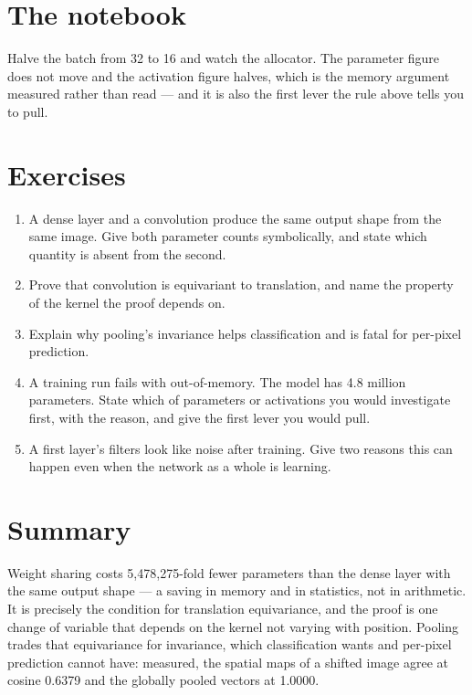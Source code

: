 \documentclass[11pt,a4paper]{article}
\begin{document}
\section{The notebook}

\begin{trybox}[title={What to change}]
Halve the batch from 32 to 16 and watch the allocator. The parameter figure
does not move and the activation figure halves, which is the memory argument
measured rather than read --- and it is also the first lever the rule above
tells you to pull.
\end{trybox}

\section{Exercises}

\begin{enumerate}[leftmargin=1.6em,itemsep=4pt]
  \item A dense layer and a convolution produce the same output shape from the
        same image. Give both parameter counts symbolically, and state which
        quantity is absent from the second. \hfill \scope{[5]}
  \item Prove that convolution is equivariant to translation, and name the
        property of the kernel the proof depends on. \hfill \scope{[4]}
  \item Explain why pooling's invariance helps classification and is fatal for
        per-pixel prediction. \hfill \scope{[4]}
  \item A training run fails with out-of-memory. The model has 4.8 million
        parameters. State which of parameters or activations you would
        investigate first, with the reason, and give the first lever you would
        pull. \hfill \scope{[5]}
  \item A first layer's filters look like noise after training. Give two
        reasons this can happen even when the network as a whole is learning.
        \hfill \scope{[4]}
\end{enumerate}

\section*{Summary}

Weight sharing costs 5{,}478{,}275-fold fewer parameters than the dense layer
with the same output shape --- a saving in memory and in statistics, not in
arithmetic. It is precisely the condition for translation equivariance, and the
proof is one change of variable that depends on the kernel not varying with
position. Pooling trades that equivariance for invariance, which classification
wants and per-pixel prediction cannot have: measured, the spatial maps of a
shifted image agree at cosine 0.6379 and the globally pooled vectors at 1.0000.
\end{document}
